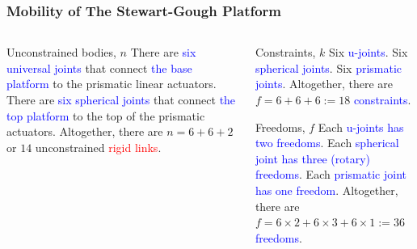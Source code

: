 \begin{frame}
	\frametitle{Mobility of The Stewart-Gough Platform}
	\begin{columns}[]
		\begin{column}{.45\linewidth}
			\begin{block}{Unconstrained bodies, $n$}
				There are \textcolor{blue}{six universal joints} that connect \textcolor{blue}{the base platform} to the prismatic linear actuators. There are \textcolor{blue}{six spherical joints} that connect \textcolor{blue}{the top platform} to the top of the prismatic actuators. Altogether, there are $n=6+6+2$ or $14$ unconstrained \textcolor{red}{rigid links}.
			\end{block}
		\end{column}
		\begin{column}{.55\linewidth}
			\begin{block}{Constraints, $k$}			
				Six \textcolor{blue}{u-joints}. Six \textcolor{blue}{spherical joints}.  Six \textcolor{blue}{prismatic joints}. Altogether, there are $f=6+6+6:=18$ \textcolor{blue}{constraints}.
			\end{block}
			\begin{block}{Freedoms, $f$}			
				Each \textcolor{blue}{u-joints has two freedoms}. Each \textcolor{blue}{spherical joint has three (rotary) freedoms}.  Each \textcolor{blue}{prismatic joint has one freedom}. Altogether, there are $f=6\times2+6\times3+6\times1:=36$ \textcolor{blue}{freedoms}.
			\end{block}
		
		\end{column}
	\end{columns}
\end{frame}
